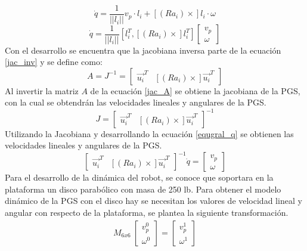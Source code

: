 \begin{equation}
\dot{q} = \frac{1}{||l_i||} v_p \cdot l_i + [(Ra_i)\times]l_i \cdot \omega
\end{equation}
\begin{equation} \label{jac_inv}
\dot{q} = \frac{1}{||l_i||} [l_i^T , [(Ra_i)\times]l_i^T] \begin{bmatrix}
v_p\\
\omega
\end{bmatrix}
\end{equation}
Con el desarrollo se encuentra que la jacobiana inversa parte de la ecuación \ref{jac_inv} y se define como:
\begin{equation}\label{jac_A}
A = J^{-1} = \begin{bmatrix}
\vec{u_i}^T & [(Ra_i)\times]\vec{u_i}^T
\end{bmatrix}
\end{equation}
Al invertir la matriz $A$ de la ecuación \ref{jac_A} se obtiene la jacobiana de la PGS, con la cual se obtendrán las velocidades lineales y angulares de la PGS.
\begin{equation*}
J = \begin{bmatrix}
\vec{u_i}^T & [(Ra_i)\times]\vec{u_i}^T
\end{bmatrix}^{-1}
\end{equation*}
Utilizando la Jacobiana y desarrollando la ecuación \ref{equgral_q} se obtienen las velocidades lineales y angulares de la PGS.
\begin{equation*}
\begin{bmatrix}
\vec{u_i}^T & [(Ra_i)\times]\vec{u_i}^T
\end{bmatrix}^{-1} \dot{q} = \begin{bmatrix}
v_p\\
\omega
\end{bmatrix}
\end{equation*}
Para el desarrollo de la dinámica del robot, se conoce que soportara en la plataforma un disco parabólico con masa de 250 lb. Para obtener el modelo dinámico de la PGS con el disco hay se necesitan los valores de velocidad lineal y angular con respecto de la plataforma, se plantea la siguiente transformación.
\begin{equation} \label{equ_tr0-1}
\begin{split}
M_{6x6}\
\begin{bmatrix}
v_p^0\\
\omega^0
\end{bmatrix}  = \begin{bmatrix}
v_p^1\\
\omega^1
\end{bmatrix}
\end{split}
\end{equation}
